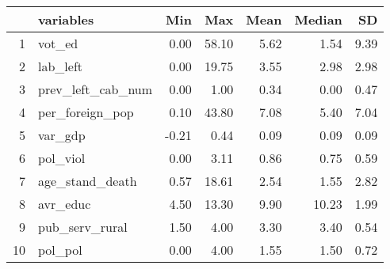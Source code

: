 \begin{table}[ht]
\centering
\begin{tabular}{rlrrrrr}
  \hline
 & variables & Min & Max & Mean & Median & SD \\ 
  \hline
1 & vot\_ed & 0.00 & 58.10 & 5.62 & 1.54 & 9.39 \\ 
  2 & lab\_left & 0.00 & 19.75 & 3.55 & 2.98 & 2.98 \\ 
  3 & prev\_left\_cab\_num & 0.00 & 1.00 & 0.34 & 0.00 & 0.47 \\ 
  4 & per\_foreign\_pop & 0.10 & 43.80 & 7.08 & 5.40 & 7.04 \\ 
  5 & var\_gdp & -0.21 & 0.44 & 0.09 & 0.09 & 0.09 \\ 
  6 & pol\_viol & 0.00 & 3.11 & 0.86 & 0.75 & 0.59 \\ 
  7 & age\_stand\_death & 0.57 & 18.61 & 2.54 & 1.55 & 2.82 \\ 
  8 & avr\_educ & 4.50 & 13.30 & 9.90 & 10.23 & 1.99 \\ 
  9 & pub\_serv\_rural & 1.50 & 4.00 & 3.30 & 3.40 & 0.54 \\ 
  10 & pol\_pol & 0.00 & 4.00 & 1.55 & 1.50 & 0.72 \\ 
   \hline
\end{tabular}
\end{table}
